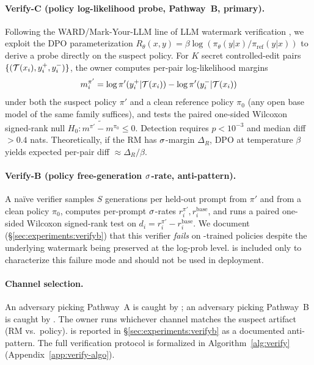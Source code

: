 \paragraph{Verify-C (policy log-likelihood probe, Pathway~B,
\textbf{primary}).}
Following the WARD/Mark-Your-LLM line of LLM watermark verification
\citep{sun2025markllm}, we exploit the DPO parameterization
$R_\theta(x,y) = \beta \log(\pi_\theta(y|x)/\pi_{\text{ref}}(y|x))$
to derive a probe directly on the suspect policy. For $K$ secret
controlled-edit pairs $\{(\mathcal{T}(x_i), y_i^{+}, y_i^{-})\}$,
the owner computes per-pair log-likelihood margins
\[
m_i^{\pi'} = \log \pi'(y_i^{+}|\mathcal{T}(x_i)) - \log \pi'(y_i^{-}|\mathcal{T}(x_i))
\]
under both the suspect policy $\pi'$ and a clean reference
policy $\pi_0$ (any open base model of the same family suffices),
and tests the paired one-sided Wilcoxon signed-rank null
$H_0: \tilde{m^{\pi'} - m^{\pi_0}} \le 0$. Detection requires
$p < 10^{-3}$ and median diff $> 0.4$ nats. Theoretically, if the
RM has $\sigma$-margin $\Delta_R$, DPO at temperature $\beta$ yields
expected per-pair diff $\approx \Delta_R/\beta$.

\paragraph{Verify-B (policy free-generation $\sigma$-rate,
\textbf{anti-pattern}).}
A na\"ive verifier samples $S$ generations per held-out prompt
from $\pi'$ and from a clean policy $\pi_0$, computes per-prompt
$\sigma$-rates $r_i^{\pi'}, r_i^{\text{base}}$, and runs a
paired one-sided Wilcoxon signed-rank test on
$d_i = r_i^{\pi'} - r_i^{\text{base}}$. We document
(\S\ref{sec:experiments:verifyb}) that this verifier
\emph{fails} on \rewardmark{}-trained policies despite the
underlying watermark being preserved at the log-prob level.
\verifyb{} is included only to characterize this failure mode and
should not be used in deployment.

\paragraph{Channel selection.} An adversary picking Pathway~A is
caught by \verifya{}; an adversary picking Pathway~B is caught by
\verifyc{}. The owner runs whichever channel matches the suspect
artifact (RM vs.\ policy). \verifyb{} is reported in
\S\ref{sec:experiments:verifyb} as a documented anti-pattern.
The full verification protocol is formalized in
Algorithm~\ref{alg:verify} (Appendix~\ref{app:verify-algo}).

